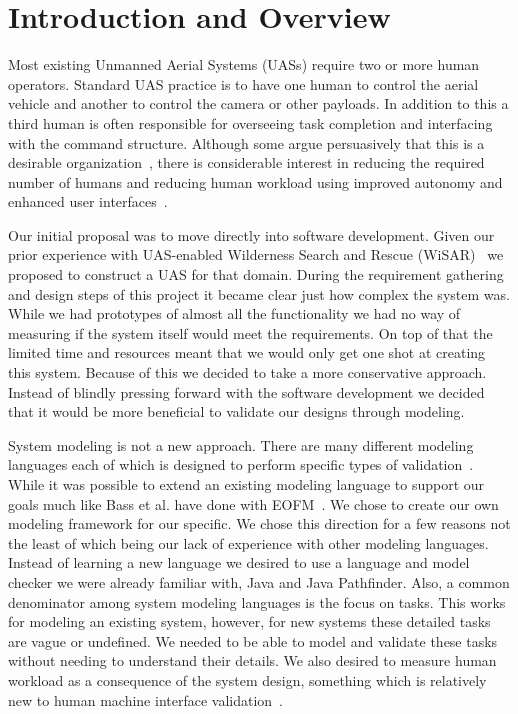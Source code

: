 \chapter{Introduction and Overview}

Most existing Unmanned Aerial Systems (UASs) require two or more human operators\cite{GoodrichMorse2008,MurphyStoverPrattGriffin2006}. Standard UAS practice is to have one human to control the aerial vehicle and another to control the camera or other payloads. In addition to this a third human is often responsible for overseeing task completion and interfacing with the command structure. Although some argue persuasively that this is a desirable organization~\cite{MurphyBurke2010}, there is considerable interest in reducing the required number of humans and reducing human workload using improved autonomy and enhanced user interfaces~\cite{Cummings2007,MitchellCummings2005,goodrich2010fanout}.

Our initial proposal was to move directly into software development.  Given our prior experience with UAS-enabled Wilderness Search and Rescue (WiSAR)~\cite{goodrich2009towards} we proposed to construct a UAS for that domain.  During the requirement gathering and design steps of this project it became clear just how complex the system was.  While we had prototypes of almost all the functionality we had no way of measuring if the system itself would meet the requirements.  On top of that the limited time and resources meant that we would only get one shot at creating this system.  Because of this we decided to take a more conservative approach.  Instead of blindly pressing forward with the software development we decided that it would be more beneficial to validate our designs through modeling.

System modeling is not a new approach.  There are many different modeling languages each of which is designed to perform specific types of validation~\cite{bolton2013litreview}.  While it was possible to extend an existing modeling language to support our goals much like Bass et al. have done with EOFM~\cite{bass2011toward}.  We chose to create our own modeling framework for our specific.  We chose this direction for a few reasons not the least of which being our lack of experience with other modeling languages.  Instead of learning a new language we desired to use a language and model checker we were already familiar with, Java and Java Pathfinder.  Also, a common denominator among system modeling languages is the focus on tasks.  This works for modeling an existing system, however, for new systems these detailed tasks are vague or undefined.  We needed to be able to model and validate these tasks without needing to understand their details.  We also desired to measure human workload as a consequence of the system design, something which is relatively new to human machine interface validation~\cite{bolton2013litreview}.


